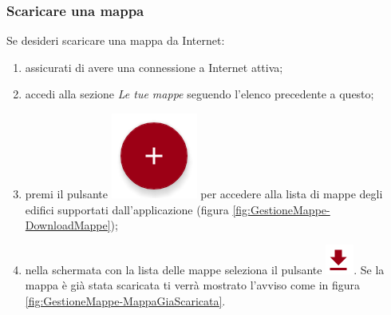 \documentclass[../ClipsManualeUtente.tex]{subfiles}
\begin{document}
		\subsubsection{Scaricare una mappa}
		Se desideri scaricare una mappa da Internet:
		\begin{enumerate}
			\item assicurati di avere una connessione a Internet attiva;
			\item accedi alla sezione \textit{Le tue mappe} seguendo l'elenco precedente a questo;
			\item premi il pulsante \includegraphics[scale=0.3]{img2/GestioneMappe-DownloadMappePulsante} per accedere alla lista di mappe degli edifici supportati dall'applicazione (figura \ref{fig:GestioneMappe-DownloadMappe});
			\item nella schermata con la lista delle mappe seleziona il pulsante \includegraphics[scale=0.5]{img2/GestioneMappe-ScaricaMappaPulsante}. Se la mappa è già stata scaricata ti verrà mostrato l'avviso come in figura \ref{fig:GestioneMappe-MappaGiaScaricata}.
		\end{enumerate}		
		
\end{document}

